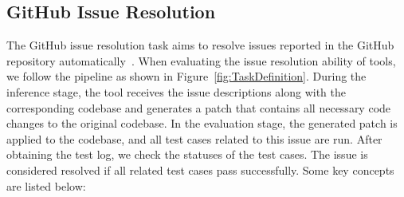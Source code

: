 \subsection{GitHub Issue Resolution}
The GitHub issue resolution task aims to resolve issues reported in the GitHub repository automatically~\cite{jimenez2023swe,zan2024swe}. %
When evaluating the issue resolution ability of tools, we follow the pipeline as shown in Figure~\ref{fig:TaskDefinition}. During the inference stage, the tool receives the issue descriptions along with the corresponding codebase and generates a patch that contains all necessary code changes to the original codebase. In the evaluation stage, the generated patch is applied to the codebase, and all test cases related to this issue are run. After obtaining the test log, we check the statuses of the test cases. The issue is considered resolved if all related test cases pass successfully. Some key concepts are listed below:


